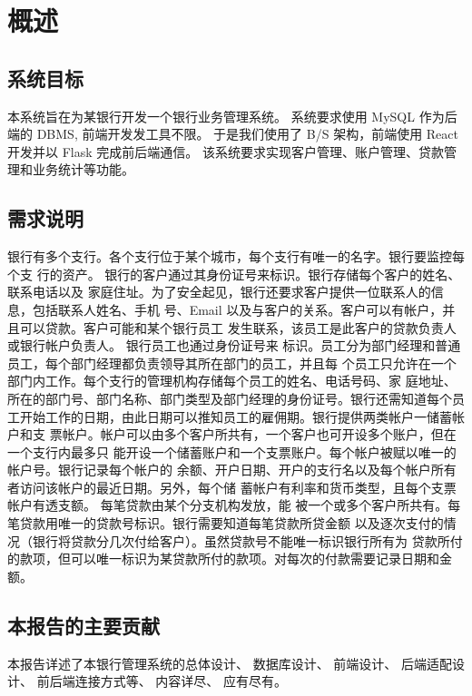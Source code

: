 \documentclass{ctexart}
\begin{document}



\tableofcontents
\section{概述}

\subsection{系统目标}

本系统旨在为某银行开发一个银行业务管理系统。
系统要求使用 MySQL 作为后端的 DBMS, 前端开发发工具不限。
于是我们使用了 B/S 架构，前端使用 React 开发并以 Flask 完成前后端通信。
该系统要求实现客户管理、账户管理、贷款管理和业务统计等功能。 

\subsection{需求说明}

银行有多个支行。各个支行位于某个城市，每个支行有唯一的名字。银行要监控每个支
行的资产。 银行的客户通过其身份证号来标识。银行存储每个客户的姓名、联系电话以及
家庭住址。为了安全起见，银行还要求客户提供一位联系人的信息，包括联系人姓名、手机
号、Email 以及与客户的关系。客户可以有帐户，并且可以贷款。客户可能和某个银行员工
发生联系，该员工是此客户的贷款负责人或银行帐户负责人。 银行员工也通过身份证号来
标识。员工分为部门经理和普通员工，每个部门经理都负责领导其所在部门的员工，并且每
个员工只允许在一个部门内工作。每个支行的管理机构存储每个员工的姓名、电话号码、家
庭地址、所在的部门号、部门名称、部门类型及部门经理的身份证号。银行还需知道每个员
工开始工作的日期，由此日期可以推知员工的雇佣期。银行提供两类帐户一储蓄帐户和支
票帐户。帐户可以由多个客户所共有，一个客户也可开设多个账户，但在一个支行内最多只
能开设一个储蓄账户和一个支票账户。每个帐户被赋以唯一的帐户号。银行记录每个帐户的
余额、开户日期、开户的支行名以及每个帐户所有者访问该帐户的最近日期。另外，每个储
蓄帐户有利率和货币类型，且每个支票帐户有透支额。 每笔贷款由某个分支机构发放，能
被一个或多个客户所共有。每笔贷款用唯一的贷款号标识。银行需要知道每笔贷款所贷金额
以及逐次支付的情况（银行将贷款分几次付给客户）。虽然贷款号不能唯一标识银行所有为
贷款所付的款项，但可以唯一标识为某贷款所付的款项。对每次的付款需要记录日期和金
额。

\subsection{本报告的主要贡献}

本报告详述了本银行管理系统的总体设计、 数据库设计、 前端设计、 后端适配设计、 前后端连接方式等、 内容详尽、 应有尽有。
\end{document}
